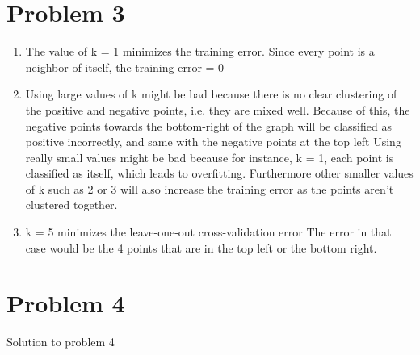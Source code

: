 \documentclass[11pt]{article}
\newcommand{\solution}[1]{{{\color{blue}{\bf Solution:} {#1}}}}
\begin{document}
\section{Problem 3}
\begin{enumerate}
\item 
\solution{} \newline
The value of k = 1 minimizes the training error.
Since every point is a neighbor of itself, the training error = 0

\item
\solution{} \newline
Using large values of k might be bad because there is no clear clustering of the positive 
and negative points, i.e. they are mixed well. Because of this, the negative points towards
the bottom-right of the graph will be classified as positive incorrectly, and same with the
negative points at the top left \newline
Using really small values might be bad because
for instance, k = 1, each point is classified as itself, which leads to overfitting.
Furthermore other smaller values of k such as 2 or 3 will also increase the training error
as the points aren't clustered together.

\item 
\solution{} \newline
k = 5 minimizes the leave-one-out cross-validation error \newline
The error in that case would be the 4 points that are in the top left
or the bottom right.

\end{enumerate}

\newpage
\section{Problem 4}
\solution{Solution to problem 4}
\end{document}
